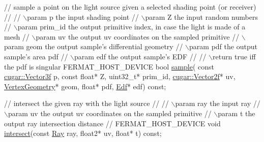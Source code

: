 \begin{DoxyParagraph}{}
\begin{DoxyCode}
   \textcolor{comment}{// sample a point on the light source given a selected shading point (or receiver)}
   \textcolor{comment}{//}
   \textcolor{comment}{// \(\backslash\)param p             the input shading point}
   \textcolor{comment}{// \(\backslash\)param Z             the input random numbers}
   \textcolor{comment}{// \(\backslash\)param prim\_id       the output primitive index, in case the light is made of a mesh}
   \textcolor{comment}{// \(\backslash\)param uv            the output uv coordinates on the sampled primitive}
   \textcolor{comment}{// \(\backslash\)param geom          the output sample's differential geometry}
   \textcolor{comment}{// \(\backslash\)param pdf           the output sample's area pdf}
   \textcolor{comment}{// \(\backslash\)param edf           the output sample's EDF}
   \textcolor{comment}{//}
   \textcolor{comment}{// \(\backslash\)return true iff the pdf is singular}
   FERMAT\_HOST\_DEVICE
   \textcolor{keywordtype}{bool} \hyperlink{group___lights_module_ga67cc240bcda4b08efd26c8727144bf16}{sample}(
       \textcolor{keyword}{const} \hyperlink{structcugar_1_1_vector}{cugar::Vector3f}   p,
       \textcolor{keyword}{const} \textcolor{keywordtype}{float}*            Z,
       uint32\_t*               prim\_id,
       \hyperlink{structcugar_1_1_vector}{cugar::Vector2f}*        uv,
       \hyperlink{struct_vertex_geometry}{VertexGeometry}*         geom,
       \textcolor{keywordtype}{float}*                  pdf,
       \hyperlink{struct_edf}{Edf}*                    edf) \textcolor{keyword}{const};

   \textcolor{comment}{// intersect the given ray with the light source}
   \textcolor{comment}{//}
   \textcolor{comment}{// \(\backslash\)param ray           the input ray}
   \textcolor{comment}{// \(\backslash\)param uv            the output uv coordinates on the sampled primitive}
   \textcolor{comment}{// \(\backslash\)param t             the output ray intersection distance}
   \textcolor{comment}{//}
   FERMAT\_HOST\_DEVICE
   \textcolor{keywordtype}{void} \hyperlink{group___lights_module_ga6a7452cab8b733d48174016b845f8d53}{intersect}(\textcolor{keyword}{const} \hyperlink{struct_ray}{Ray} ray, float2* uv, \textcolor{keywordtype}{float}* t) \textcolor{keyword}{const};


\end{DoxyCode}
\end{DoxyParagraph}
